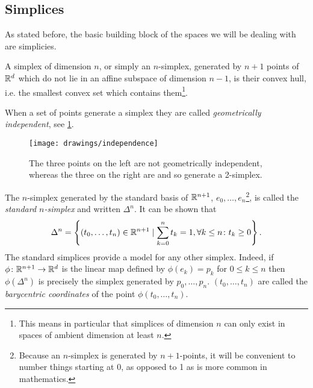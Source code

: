 \documentclass[../main.tex]{subfiles}
\begin{document}
\subsection{Simplices}
As stated before, the basic building block of the spaces we will be dealing with are
simplicies. 
\begin{definition}[Simplex]\label{def:simplex}
	A simplex of dimension \( n \), or simply an \( n \)-simplex, generated by \( n+1 \)
	points of \( \mathbb{R}^d \) which do not lie in an affine subspace of dimension \( n-1
	\), is their convex hull, i.e. the smallest convex set which contains
	them\footnote{This means in particular that simplices of dimension \( n \) can only
	exist in spaces of ambient dimension at least \( n \).}.
\end{definition}
When a set of points generate a simplex they are called \emph{geometrically independent},
see \cref{fig:independence}. 

\begin{figure}[htb]
	\centering
	\texttt{[image: drawings/independence]}
	\caption{The three points on the left are not geometrically independent, whereas the
	three on the right are and so generate a 2-simplex.}
	\label{fig:independence}
\end{figure}

The \( n \)-simplex generated by the standard basis of \( \mathbb{R}^{n+1} \), \( e_0,
\dots, e_n \)\footnote{Because an \( n \)-simplex is generated by \( n+1 \)-points, it
will be convenient to number things starting at 0, as opposed to 1 as is more
common in mathematics.}, is called the \emph{standard \( n \)-simplex} and
written \( \Delta^n \). It can be shown that
\begin{equation*}
	\Delta^n = \left\{ (t_0, \dots, t_n) \in \mathbb{R}^{n+1} \mid \sum_{k = 0}^{n} t_k = 1, \forall k
	\leq n \colon t_k \geq 0 \right\}. 
\end{equation*}
The standard simplices provide a model for any other simplex. Indeed, if \( \phi \colon
\mathbb{R}^{n+1} \to \mathbb{R}^d \) is the linear map defined by \( \phi(e_k) = p_k \) for \( 0 \leq k
\leq n \) then \( \phi(\Delta^n) \) is precisely the simplex generated by \( p_0, \dots,
p_n \). \( (t_0, \dots, t_n) \) are called the \emph{barycentric coordinates} of the point
\( \phi(t_0, \dots, t_n) \). 
\end{document}
